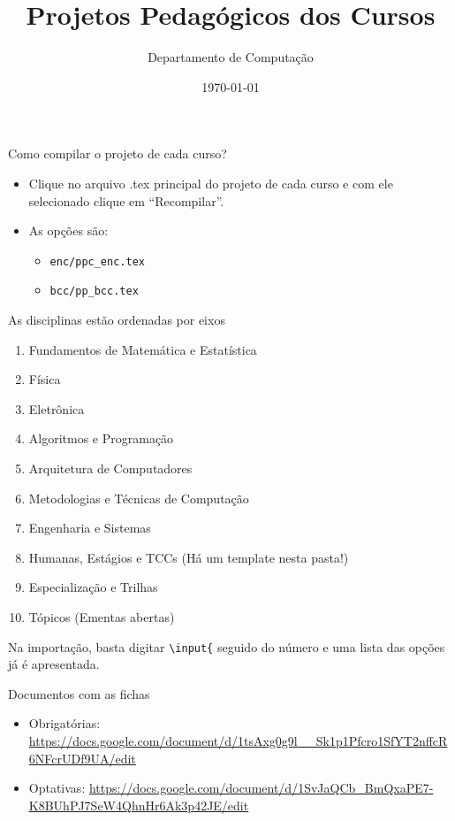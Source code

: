 \documentclass[aspectratio=169]{beamer}
\title{Projetos Pedagógicos dos Cursos}
\author{Departamento de Computação}
\date{\today}
\begin{document}
\frame{\titlepage}
 
\begin{frame}{Como compilar o projeto de cada curso?}
    \begin{itemize}
        \item Clique no arquivo .tex principal do projeto de cada curso e com ele selecionado clique em ``Recompilar''.
        \item As opções são:
        \begin{itemize}
            \item \texttt{enc/ppc\_enc.tex}
            \item \texttt{bcc/pp\_bcc.tex}
        \end{itemize}
    \end{itemize}
\end{frame}

\begin{frame}{As disciplinas estão ordenadas por eixos}
    \begin{enumerate}
        \item Fundamentos de Matemática e Estatística			\item Física
        \item Eletrônica
        \item Algoritmos e Programação
        \item Arquitetura de Computadores
        \item Metodologias e Técnicas de Computação	
        \item Engenharia e Sistemas	
        \item Humanas, Estágios e TCCs (Há um template nesta pasta!)
        \item Especialização e Trilhas	
        \item Tópicos (Ementas abertas)
    \end{enumerate}
    Na importação, basta digitar \texttt{\textbackslash input\{} seguido do número e uma lista das opções já é apresentada. 
\end{frame}

\begin{frame}{Documentos com as fichas}
    \begin{itemize}
        \item Obrigatórias: \url{https://docs.google.com/document/d/1tsAxg0g9l__Sk1p1Pfcro1SfYT2nffcR6NFcrUDf9UA/edit}
        \item Optativas: 
        \url{https://docs.google.com/document/d/1SvJaQCb_BmQxaPE7-K8BUhPJ7SeW4QhnHr6Ak3p42JE/edit}
    \end{itemize}
\end{frame}
\end{document}
